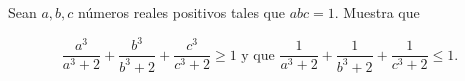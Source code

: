 Sean $a,b,c$ números reales positivos tales que $abc=1$. Muestra que

\[\frac{a^3}{a^3+2}+\frac{b^3}{b^3+2}+\frac{c^3}{c^3+2}\ge1\text{ y que }\frac1{a^3+2}+\frac1{b^3+2}+\frac1{c^3+2}\le1.\]